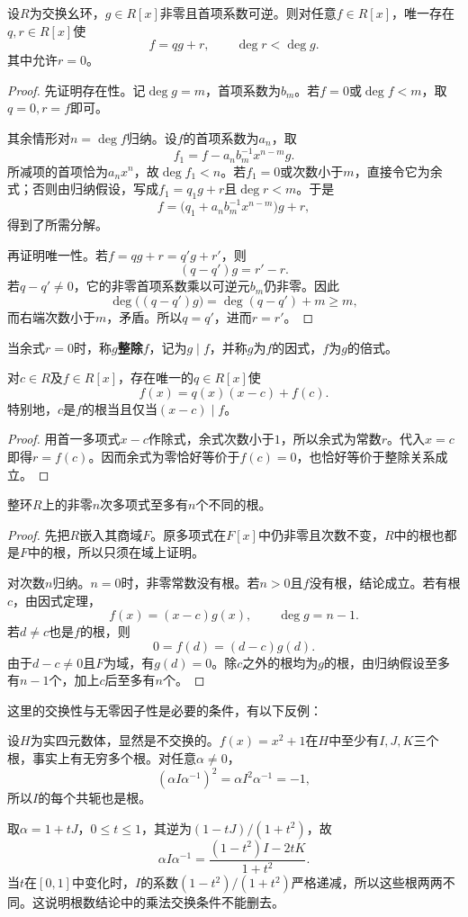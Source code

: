 \begin{theorem}\label{p2:poly-division}
设$R$为交换幺环，$g\in R[x]$非零且首项系数可逆。则对任意$f\in R[x]$，唯一存在$q,r\in R[x]$使
\[
f=qg+r,\qquad \deg r<\deg g.
\]
其中允许$r=0$。
\end{theorem}
\begin{proof}
先证明存在性。记$\deg g=m$，首项系数为$b_m$。若$f=0$或$\deg f<m$，取$q=0,r=f$即可。

其余情形对$n=\deg f$归纳。设$f$的首项系数为$a_n$，取
\[
f_1=f-a_nb_m^{-1}x^{n-m}g.
\]
所减项的首项恰为$a_nx^n$，故$\deg f_1<n$。若$f_1=0$或次数小于$m$，直接令它为余式；否则由归纳假设，写成$f_1=q_1g+r$且$\deg r<m$。于是
\[
f=\bigl(q_1+a_nb_m^{-1}x^{n-m}\bigr)g+r,
\]
得到了所需分解。

再证明唯一性。若$f=qg+r=q'g+r'$，则
\[
(q-q')g=r'-r.
\]
若$q-q'\ne0$，它的非零首项系数乘以可逆元$b_m$仍非零。因此
\[
\deg\bigl((q-q')g\bigr)=\deg(q-q')+m\ge m,
\]
而右端次数小于$m$，矛盾。所以$q=q'$，进而$r=r'$。
\end{proof}

当余式$r=0$时，称$g$\textbf{整除}$f$，记为$g\mid f$，并称$g$为$f$的因式，$f$为$g$的倍式。

\begin{corollary}
对$c\in R$及$f\in R[x]$，存在唯一的$q\in R[x]$使
\[
f(x)=q(x)(x-c)+f(c).
\]
特别地，$c$是$f$的根当且仅当$(x-c)\mid f$。
\end{corollary}
\begin{proof}
用首一多项式$x-c$作除式，余式次数小于$1$，所以余式为常数$r$。代入$x=c$即得$r=f(c)$。因而余式为零恰好等价于$f(c)=0$，也恰好等价于整除关系成立。
\end{proof}

\begin{theorem}\label{p2:poly-roots}
整环$R$上的非零$n$次多项式至多有$n$个不同的根。
\end{theorem}
\begin{proof}
先把$R$嵌入其商域$F$。原多项式在$F[x]$中仍非零且次数不变，$R$中的根也都是$F$中的根，所以只须在域上证明。

对次数$n$归纳。$n=0$时，非零常数没有根。若$n>0$且$f$没有根，结论成立。若有根$c$，由因式定理，
\[
f(x)=(x-c)g(x),\qquad\deg g=n-1.
\]
若$d\ne c$也是$f$的根，则
\[
0=f(d)=(d-c)g(d).
\]
由于$d-c\ne0$且$F$为域，有$g(d)=0$。除$c$之外的根均为$g$的根，由归纳假设至多有$n-1$个，加上$c$后至多有$n$个。
\end{proof}
这里的交换性与无零因子性是必要的条件，有以下反例：
\begin{example}
设$H$为实四元数体，显然是不交换的。$f(x)=x^2+1$在$H$中至少有$I,J,K$三个根，事实上有无穷多个根。对任意$\alpha\ne0$，
\[
(\alpha I\alpha^{-1})^2
=\alpha I^2\alpha^{-1}=-1,
\]
所以$I$的每个共轭也是根。

取$\alpha=1+tJ$，$0\le t\le1$，其逆为$(1-tJ)/(1+t^2)$，故
\[
\alpha I\alpha^{-1}
=\frac{(1-t^2)I-2tK}{1+t^2}.
\]
当$t$在$[0,1]$中变化时，$I$的系数$(1-t^2)/(1+t^2)$严格递减，所以这些根两两不同。这说明根数结论中的乘法交换条件不能删去。
\end{example}

